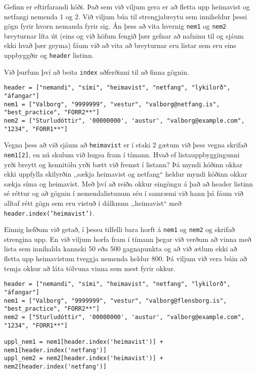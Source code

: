 \begin{exercise}\label{lst3}
Gefinn er eftirfarandi kóði.
Það sem við viljum gera er að fletta upp heimavist og netfangi nemenda 1 og 2.
Við viljum búa til strengjabreytu sem inniheldur þessi gögn fyrir hvorn nemanda fyrir sig.
Án þess að vita hvernig \texttt{nem1} og \texttt{nem2} breyturnar líta út (eins og við höfum fengið þær gefnar að nafninu til og sjáum ekki hvað þær geyma) fáum við að vita að breyturnar eru listar sem eru eins uppbyggðir og \texttt{header} listinn.

Við þurfum því að beita \texttt{index} aðferðinni til að finna gögnin.
\begin{lstlisting}
header = ["nemandi", "sími", "heimavist", "netfang", "lykilorð", "áfangar"]
nem1 = ["Valborg", "9999999", "vestur", "valborg@netfang.is", "best_practice", "FORR2**"]
nem2 = ["Sturludóttir", '00000000', 'austur', "valborg@example.com", "1234", "FORR1**"]\end{lstlisting}

\end{exercise}
\begin{Answer}[ref={lst3}]
	Vegna þess að við sjáum að \texttt{heimavist} er í staki 2 gætum við þess vegna skrifað \texttt{nem1[2]}, en nú skulum við hugsa fram í tímann.
	Hvað ef listauppbyggingunni yrði breytt og kennitölu yrði bætt við fremst í listann?
	Þá myndi kóðinn okkar ekki uppfylla skilyrðin ,,sækja heimavist og netfang“ heldur myndi kóðinn okkar sækja síma og heimavist.
	Með því að reiða okkur eingöngu á það að header listinn sé réttur og að gögnin í nemendalistunum séu í samræmi við hann þá fáum við alltaf rétt gögn sem eru vistuð í dálknum ,,heimavist“ með \texttt{header.index('heimavist')}.


	Einnig hefðum við getað, í þessu tilfelli bara horft á \texttt{nem1} og \texttt{nem2} og skrifað strengina upp.
	En við viljum horfa fram í tímann þegar við verðum að vinna með lista sem innihalda kannski 50 eða 500 gagnapunkta og að við ætlum ekki að fletta upp heimavistum tveggja nemenda heldur 800.
	Þá viljum við vera búin að temja okkur að láta tölvuna vinna sem mest fyrir okkur. 
\begin{lstlisting}
header = ["nemandi", "sími", "heimavist", "netfang", "lykilorð", "áfangar"]
nem1 = ["Valborg", "9999999", "vestur", "valborg@flensborg.is", "best_practice", "FORR2**"]
nem2 = ["Sturludóttir", '00000000', 'austur', "valborg@example.com", "1234", "FORR1**"]

uppl_nem1 = nem1[header.index('heimavist')] + nem1[header.index('netfang')]
uppl_nem2 = nem2[header.index('heimavist')] + nem2[header.index('netfang')]\end{lstlisting}
\end{Answer}

